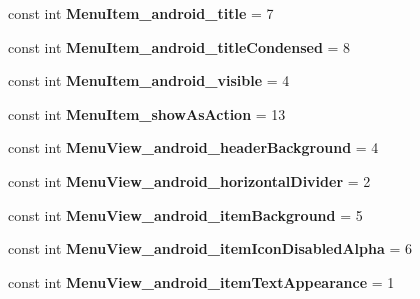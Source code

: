 \begin{DoxyCompactItemize}
const int {\bfseries Menu\+Item\+\_\+android\+\_\+title} = 7
\item 
\mbox{\label{class_sample_app_1_1_droid_1_1_resource_1_1_styleable_a9cc7479f8ed20c208323c070c22b406d}} 
const int {\bfseries Menu\+Item\+\_\+android\+\_\+title\+Condensed} = 8
\item 
\mbox{\label{class_sample_app_1_1_droid_1_1_resource_1_1_styleable_a0933eac30972f6e8582c7b55b932b106}} 
const int {\bfseries Menu\+Item\+\_\+android\+\_\+visible} = 4
\item 
\mbox{\label{class_sample_app_1_1_droid_1_1_resource_1_1_styleable_a9f6029bb2f137e15bec5394915098f81}} 
const int {\bfseries Menu\+Item\+\_\+show\+As\+Action} = 13
\item 
\mbox{\label{class_sample_app_1_1_droid_1_1_resource_1_1_styleable_afb64dfc235e382da4e1563e54453498d}} 
const int {\bfseries Menu\+View\+\_\+android\+\_\+header\+Background} = 4
\item 
\mbox{\label{class_sample_app_1_1_droid_1_1_resource_1_1_styleable_a3b82cd26883e4fe85278562b44afa82d}} 
const int {\bfseries Menu\+View\+\_\+android\+\_\+horizontal\+Divider} = 2
\item 
\mbox{\label{class_sample_app_1_1_droid_1_1_resource_1_1_styleable_a58b373240274e6f58db6443b3c5264bb}} 
const int {\bfseries Menu\+View\+\_\+android\+\_\+item\+Background} = 5
\item 
\mbox{\label{class_sample_app_1_1_droid_1_1_resource_1_1_styleable_aba6ceb7eeb186c12cc48a7748a0e0c16}} 
const int {\bfseries Menu\+View\+\_\+android\+\_\+item\+Icon\+Disabled\+Alpha} = 6
\item 
\mbox{\label{class_sample_app_1_1_droid_1_1_resource_1_1_styleable_af475c832acda0afdb93f829e65fe0a0d}} 
const int {\bfseries Menu\+View\+\_\+android\+\_\+item\+Text\+Appearance} = 1

\end{DoxyCompactItemize}
